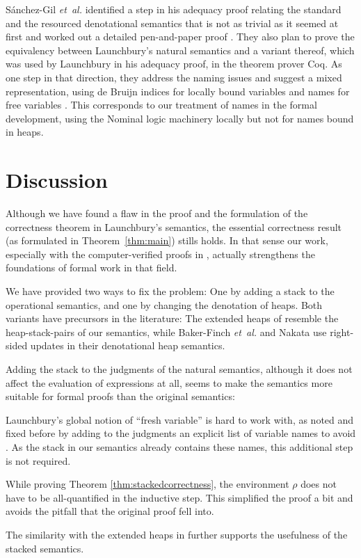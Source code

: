 \documentclass{scrartcl}
\theoremstyle{nonumberbreak}
\newcommand{\shortcite}{\cite}
\begin{document}
S{\'a}nchez-Gil {\em et~al.} identified a step in his adequacy proof relating the standard and the resourced denotational semantics that is not as trivial as it seemed at first and worked out a detailed pen-and-paper proof \shortcite{functionspaces}. They also plan to prove the equivalency between Launchbury’s natural semantics and a variant thereof, which was used by Launchbury in his adequacy proof, in the theorem prover Coq. As one step in that direction, they address the naming issues and suggest a mixed representation, using de Bruijn indices for locally bound variables and names for free variables \shortcite{nameless}. This corresponds to our treatment of names in the formal development, using the Nominal logic machinery \cite{nominal} locally but not for names bound in heaps.

\section{Discussion}

Although we have found a flaw in the proof and the formulation of the correctness theorem in Launchbury’s semantics, the essential correctness result (as formulated in Theorem~\ref{thm:main}) stills holds. In that sense our work, especially with the computer-verified proofs in \cite{afp}, actually strengthens the foundations of formal work in that field.

We have provided two ways to fix the problem: One by adding a stack to the operational semantics, and one by changing the denotation of heaps. Both variants have precursors in the literature: The extended heaps of \cite{distributed} resemble the heap-stack-pairs of our semantics, while Baker-Finch {\em et~al.} \shortcite{parallel} and Nakata \shortcite{nakata_blackhole} use right-sided updates in their denotational heap semantics.

Adding the stack to the judgments of the natural semantics, although it does not affect the evaluation of expressions at all, seems to make the semantics more suitable for formal proofs than the original semantics:
\begin{compactitem}
\item Launchbury’s global notion of “fresh variable” is hard to work with, as noted and fixed before by adding to the judgments an explicit list of variable names to avoid \cite{sestoft}. As the stack in our semantics already contains these names, this additional step is not required.
\item While proving Theorem \ref{thm:stackedcorrectness}, the environment $\rho$ does not have to be all-quantified in the inductive step. This simplified the proof a bit and avoids the pitfall that the original proof fell into.
\end{compactitem}
The similarity with the extended heaps in \cite{distributed} further supports the usefulness of the stacked semantics.
\end{document}
